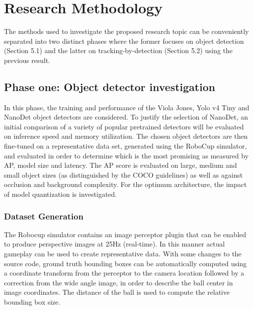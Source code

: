 \documentclass[a4paper,twoside,12pt]{report}
\begin{document}
\chapter{Research Methodology}

The methods used to investigate the proposed research topic can be conveniently separated into two distinct phases where the former focuses on object detection (Section 5.1) and the latter on tracking-by-detection (Section 5.2) using the previous result. 

\section{Phase one: Object detector investigation}

In this phase, the training and performance of the Viola Jones, Yolo v4 Tiny and NanoDet object detectors are considered. To justify the selection of NanoDet, an initial comparison of a variety of popular pretrained detectors will be evaluated on inference speed and memory utilization. The chosen object detectors are then fine-tuned on a representative data set, generated using the RoboCup simulator, and evaluated in order to determine which is the most promising as measured by AP, model size and latency. The AP score is evaluated on large, medium and small object sizes (as distinguished by the COCO guidelines) as well as against occlusion and background complexity. For the optimum architecture, the impact of model quantization is investigated.

\subsection{Dataset Generation}

The Robocup simulator contains an image perceptor plugin that can be enabled to produce perspective images at 25Hz (real-time). In this manner actual gameplay can be used to create representative data. 
With some changes to the source code, ground truth bounding boxes can be automatically computed using a coordinate transform from the perceptor to the camera location followed by a correction from the wide angle image, in order to describe the ball center in image coordinates. The distance of the ball is used to compute the relative bounding box size.
\end{document}
